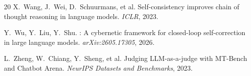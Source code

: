 \documentclass[11pt]{article}
\begin{document}
\begin{thebibliography}{20}
X.~Wang, J.~Wei, D.~Schuurmans, et al.
\newblock Self-consistency improves chain of thought reasoning in
language models.
\newblock \emph{ICLR}, 2023.

Y.~Wu, Y.~Liu, Y.~Shu.
: A cybernetic framework for closed-loop
self-correction in large language models.
\newblock \emph{arXiv:2605.17305}, 2026.

L.~Zheng, W.~Chiang, Y.~Sheng, et al.
\newblock Judging {LLM}-as-a-judge with {MT}-Bench and Chatbot
Arena.
\newblock \emph{NeurIPS Datasets and Benchmarks}, 2023.

\end{thebibliography}
\end{document}
